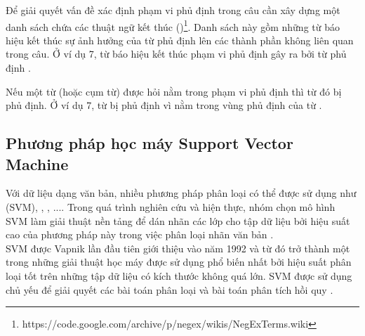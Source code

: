 
Để giải quyết vấn đề xác định phạm vi phủ định trong câu cần xây dựng một danh sách chứa các thuật ngữ kết thúc ()\footnote{https://code.google.com/archive/p/negex/wikis/NegExTerms.wiki}. Danh sách này gồm những từ báo hiệu kết thúc sự ảnh hưởng của từ phủ định lên các thành phần không liên quan trong câu. Ở ví dụ 7, từ  báo hiệu kết thúc phạm vi phủ định gây ra bởi từ phủ định .


Nếu một từ (hoặc cụm từ) được hỏi nằm trong phạm vi phủ định thì từ đó bị phủ định. Ở ví dụ 7, từ  bị phủ định vì nằm trong vùng phủ định của từ .

\subsection{Phương pháp học máy Support Vector Machine}
Với dữ liệu dạng văn bản, nhiều phương pháp phân loại có thể được sử dụng như  (SVM), , , ...\cite{manning2009anintroduction}. Trong quá trình nghiên cứu và hiện thực, nhóm chọn mô hình SVM làm giải thuật nền tảng để dán nhãn các lớp cho tập dữ liệu bởi hiệu suất cao của phương pháp này trong việc phân loại nhãn văn bản \cite{joachims1998text}.\\

SVM được Vapnik lần đầu tiên giới thiệu vào năm 1992 và từ đó trở thành một trong những giải thuật học máy được sử dụng phổ biến nhất bởi hiệu suất phân loại tốt trên những tập dữ liệu có kích thước không quá lớn. SVM được sử dụng chủ yếu để giải quyết các bài toán phân loại và bài toán phân tích hồi quy \cite{chandrakala2012opinion}\cite{manning2009anintroduction}. \\

